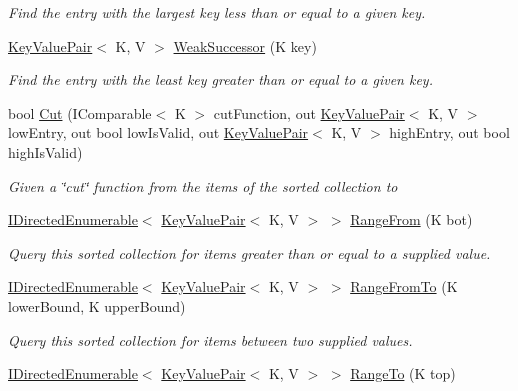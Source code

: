 \begin{DoxyCompactItemize}
\begin{DoxyCompactList}\small\item\em Find the entry with the largest key less than or equal to a given key. \end{DoxyCompactList}\item 
\hyperlink{struct_c5_1_1_key_value_pair}{Key\+Value\+Pair}$<$ K, V $>$ \hyperlink{interface_c5_1_1_i_sorted_dictionary_a3829a2cfb58bc90c600eb2fcc12e1d25}{Weak\+Successor} (K key)
\begin{DoxyCompactList}\small\item\em Find the entry with the least key greater than or equal to a given key. \end{DoxyCompactList}\item 
bool \hyperlink{interface_c5_1_1_i_sorted_dictionary_a28731370f84789bb4535ed92b2e38460}{Cut} (I\+Comparable$<$ K $>$ cut\+Function, out \hyperlink{struct_c5_1_1_key_value_pair}{Key\+Value\+Pair}$<$ K, V $>$ low\+Entry, out bool low\+Is\+Valid, out \hyperlink{struct_c5_1_1_key_value_pair}{Key\+Value\+Pair}$<$ K, V $>$ high\+Entry, out bool high\+Is\+Valid)
\begin{DoxyCompactList}\small\item\em Given a \char`\"{}cut\char`\"{} function from the items of the sorted collection to \end{DoxyCompactList}\item 
\hyperlink{interface_c5_1_1_i_directed_enumerable}{I\+Directed\+Enumerable}$<$ \hyperlink{struct_c5_1_1_key_value_pair}{Key\+Value\+Pair}$<$ K, V $>$ $>$ \hyperlink{interface_c5_1_1_i_sorted_dictionary_afafbf6064911808de36b781dd8085419}{Range\+From} (K bot)
\begin{DoxyCompactList}\small\item\em Query this sorted collection for items greater than or equal to a supplied value. \end{DoxyCompactList}\item 
\hyperlink{interface_c5_1_1_i_directed_enumerable}{I\+Directed\+Enumerable}$<$ \hyperlink{struct_c5_1_1_key_value_pair}{Key\+Value\+Pair}$<$ K, V $>$ $>$ \hyperlink{interface_c5_1_1_i_sorted_dictionary_a081b4c43958d18e8ee92dc234d5e8adc}{Range\+From\+To} (K lower\+Bound, K upper\+Bound)
\begin{DoxyCompactList}\small\item\em Query this sorted collection for items between two supplied values. \end{DoxyCompactList}\item 
\hyperlink{interface_c5_1_1_i_directed_enumerable}{I\+Directed\+Enumerable}$<$ \hyperlink{struct_c5_1_1_key_value_pair}{Key\+Value\+Pair}$<$ K, V $>$ $>$ \hyperlink{interface_c5_1_1_i_sorted_dictionary_aa595a13cff654c2a9b4a257402ffa5a1}{Range\+To} (K top)

\end{DoxyCompactItemize}

